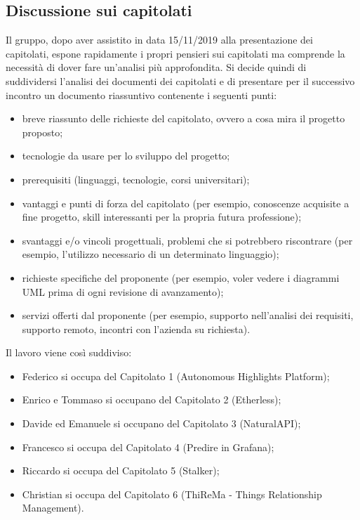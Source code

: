\subsection{Discussione sui capitolati}
Il gruppo, dopo aver assistito in data 15/11/2019 alla presentazione dei capitolati, espone rapidamente i propri pensieri sui capitolati ma comprende la necessità di dover fare un'analisi più approfondita.
Si decide quindi di suddividersi l'analisi dei documenti dei capitolati e di presentare per il successivo incontro un documento riassuntivo contenente i seguenti punti:
\begin{itemize}
	\item breve riassunto delle richieste del capitolato, ovvero a cosa mira il progetto proposto;
	\item tecnologie da usare per lo sviluppo del progetto;
	\item prerequisiti (linguaggi, tecnologie, corsi universitari);
	\item vantaggi e punti di forza del capitolato (per esempio, conoscenze acquisite a fine progetto, skill interessanti per la propria futura professione);
	\item svantaggi e/o vincoli progettuali, problemi che si potrebbero riscontrare (per esempio, l'utilizzo necessario di un determinato linguaggio);
	\item richieste specifiche del proponente (per esempio, voler vedere i diagrammi UML prima di ogni revisione di avanzamento);
	\item servizi offerti dal proponente (per esempio, supporto nell’analisi dei requisiti, supporto remoto, incontri con l’azienda su richiesta).
\end{itemize}
Il lavoro viene così suddiviso:
\begin{itemize}
	\item Federico si occupa del Capitolato 1 (Autonomous Highlights Platform);
	\item Enrico e Tommaso si occupano del Capitolato 2 (Etherless);
	\item Davide ed Emanuele si occupano del Capitolato 3 (NaturalAPI);
	\item Francesco si occupa del Capitolato 4 (Predire in Grafana);
	\item Riccardo si occupa del Capitolato 5 (Stalker);
	\item Christian si occupa del Capitolato 6 (ThiReMa - Things Relationship Management).
\end{itemize}


\clearpage